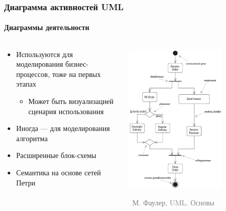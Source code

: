 \documentclass[xetex,mathserif,serif]{beamer}
\newcommand{\attribution}[1] {
	\vspace{-5mm}\begin{flushright}\begin{scriptsize}\textcolor{gray}{\textcopyright\, #1}\end{scriptsize}\end{flushright}
}
\begin{document}
	\begin{frame}
		\frametitle{Диаграмма активностей UML}
		\framesubtitle{Диаграммы деятельности}
		\begin{columns}
			\begin{column}{0.5\textwidth}
				\begin{itemize}
					\item Используются для моделирования бизнес-процессов, тоже на первых этапах
					\begin{itemize}
						\item Может быть визуализацией сценария использования
					\end{itemize}
					\item Иногда --- для моделирования алгоритма
					\item Расширенные блок-схемы
					\item Семантика на основе сетей Петри
				\end{itemize}
			\end{column}
			\begin{column}{0.5\textwidth}
				\begin{center}
					\includegraphics[width=0.7\textwidth]{activityDiagram.png}
					\attribution{М. Фаулер, UML. Основы}
				\end{center}
			\end{column}
		\end{columns}
	\end{frame}
\end{document}
